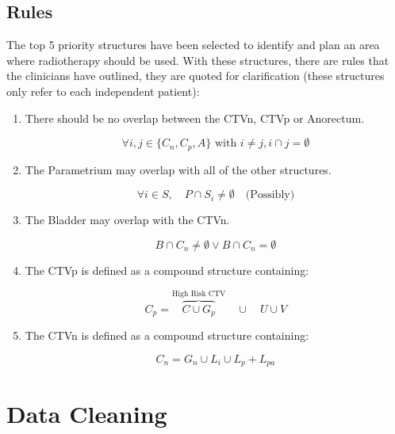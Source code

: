 \documentclass[11pt,twoside]{report}
\begin{document}
\subsection{Rules}

The top 5 priority structures have been selected to identify and plan an area where radiotherapy should be used. With these structures, there are rules that the clinicians have outlined, they are quoted for clarification (these structures only refer to each independent patient):

\begin{enumerate}
  \item There should be no overlap between the CTVn, CTVp or Anorectum. 
  
  \begin{equation}
    \forall{i,j \in \{C_n, C_p, A\}}\text{ with } i \neq j, i \cap j = \emptyset
  \end{equation}

  \item The Parametrium may overlap with all of the other structures.
  
  \begin{equation}
    \forall i \in S, \quad P \cap S_i \neq \emptyset \quad \text{(Possibly)}
  \end{equation}

  \item The Bladder may overlap with the CTVn.
  
  \begin{equation}
    B \cap C_n \neq \emptyset \vee B \cap C_n = \emptyset\label{eq:ctvn}
  \end{equation}

  \item The CTVp is defined as a compound structure containing:
  
  \begin{equation}
    C_p = \overbrace{C \cup G_p}^{\text{High Risk CTV}} \quad \cup \quad U \cup V\label{eq:ctvp}
  \end{equation}

  \item The CTVn is defined as a compound structure containing: 
  
  \begin{equation}
    C_n = G_n \cup L_i \cup L_p + L_{pa}
  \end{equation}
  
\end{enumerate}

\section{Data Cleaning}\label{sect:data-cleaning}
\end{document}
